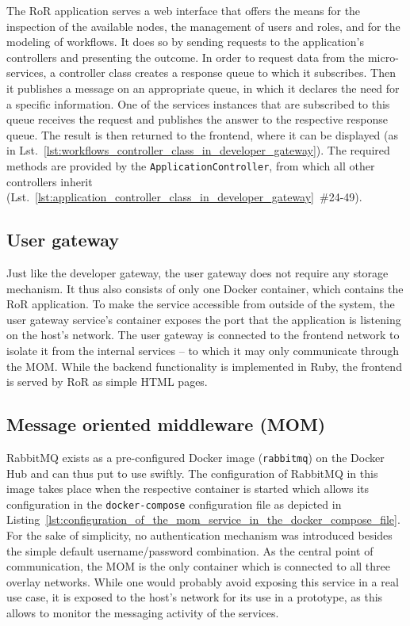     The \ac{RoR} application serves a web interface that offers the means for the inspection of the available nodes, the management of users and roles, and for the modeling of workflows. It does so by sending requests to the application's controllers and presenting the outcome.
    In order to request data from the micro-services, a controller class creates a response queue to which it subscribes. Then it publishes a message on an appropriate queue, in which it declares the need for a specific information. One of the services instances that are subscribed to this queue receives the request and publishes the answer to the respective response queue. The result is then returned to the frontend, where it can be displayed (\eg as in Lst.~\ref{lst:workflows_controller_class_in_developer_gateway}). The required methods are provided by the \texttt{ApplicationController}, from which all other controllers inherit (Lst.~\ref{lst:application_controller_class_in_developer_gateway}~\#24-49).


  \subsection{User gateway} %
    \label{sub:user_gateway}
    Just like the developer gateway, the user gateway does not require any storage mechanism. It thus also consists of only one Docker container, which contains the \ac{RoR} application. To make the service accessible from outside of the system, the user gateway service's container exposes the port that the  application is listening on the host's network. The user gateway is connected to the frontend network to isolate it from the internal services -- to which it may only communicate through the \ac{MOM}.
    While the backend functionality is implemented in Ruby, the frontend is served by \ac{RoR} as simple \ac{HTML} pages.

  \subsection{Message oriented middleware (MOM)} %
    \label{sub:message_oriented_middleware}
      RabbitMQ exists as a pre-configured Docker image (\texttt{rabbitmq}) on the Docker Hub and can thus put to use swiftly. The configuration of RabbitMQ in this image takes place when the respective container is started which allows its configuration in the \texttt{docker-compose} configuration file as depicted in Listing~\ref{lst:configuration_of_the_mom_service_in_the_docker_compose_file}.
      For the sake of simplicity, no authentication mechanism was introduced besides the simple default username/password combination. As the central point of communication, the \ac{MOM} is the only container which is connected to all three overlay networks. While one would probably avoid exposing this service in a real use case, it is exposed to the host's network for its use in a prototype, as this allows to monitor the messaging activity of the services.

